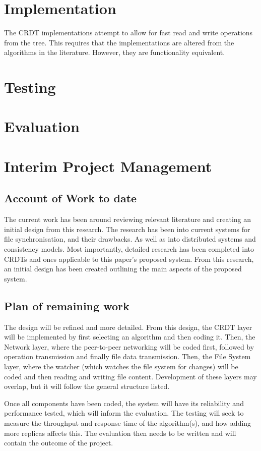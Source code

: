 \documentclass[12pt]{report}
\begin{document}
\chapter{Implementation}\label{sec:implementation}
The CRDT implementations attempt to allow for fast read and write operations from the tree. This requires that the implementations are altered from the algorithms in the literature. However, they are functionality equivalent. \par


\chapter{Testing}

\chapter{Evaluation}

\printbibliography

\appendix

\chapter{Interim Project Management}

\section{Account of Work to date}
The current work has been around reviewing relevant literature and creating an initial design from this research. The research has been into current systems for file synchronisation, and their drawbacks. As well as into distributed systems and consistency models. Most importantly, detailed research has been completed into CRDTs and ones applicable to this paper's proposed system. From this research, an initial design has been created outlining the main aspects of the proposed system.

\section{Plan of remaining work}
The design will be refined and more detailed. From this design, the CRDT layer will be implemented by first selecting an algorithm and then coding it. Then, the Network layer, where the peer-to-peer networking will be coded first, followed by operation transmission and finally file data transmission. Then, the File System layer, where the watcher (which watches the file system for changes) will be coded and then reading and writing file content. Development of these layers may overlap, but it will follow the general structure listed. \par
Once all components have been coded, the system will have its reliability and performance tested, which will inform the evaluation. The testing will seek to measure the throughput and response time of the algorithm(s), and how adding more replicas affects this. The evaluation then needs to be written and will contain the outcome of the project.
\end{document}
